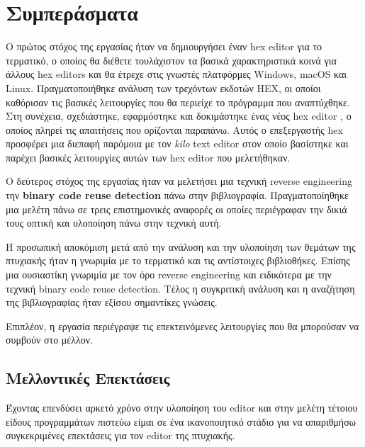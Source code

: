 \section{Συμπεράσματα}

Ο πρώτος στόχος της εργασίας ήταν να δημιουργήσει έναν hex editor για το τερματικό, ο οποίος θα διέθετε τουλάχιστον τα βασικά χαρακτηριστικά κοινά για άλλους hex editors και θα έτρεχε στις γνωστές πλατφόρμες Windows, macOS και Linux.
Πραγματοποιήθηκε ανάλυση των τρεχόντων εκδοτών HEX, οι οποίοι καθόρισαν τις βασικές λειτουργίες που θα περιείχε το πρόγραμμα που αναπτύχθηκε.
Στη συνέχεια, σχεδιάστηκε, εφαρμόστηκε και δοκιμάστηκε ένας νέος hex editor , ο οποίος πληρεί τις απαιτήσεις που ορίζονται παραπάνω.
Αυτός ο επεξεργαστής hex προσφέρει μια διεπαφή παρόμοια με τον \emph{kilo} text editor στον οποίο βασίστηκε και παρέχει βασικές λειτουργίες αυτών των hex editor που μελετήθηκαν.

Ο δεύτερος στόχος της εργασίας ήταν να μελετήσει μια τεχνική reverse engineering την \textbf{binary code reuse detection} πάνω στην βιβλιογραφία.
Πραγματοποίηθηκε μια μελέτη πάνω σε τρεις επιστημονικές αναφορές οι οποίες περιέγραφαν την δικιά τους οπτική και υλοποίηση πάνω στην τεχνική αυτή. 

H προσωπική αποκόμιση μετά από την ανάλυση και την υλοποίηση των θεμάτων της πτυχιακής ήταν η γνωριμία με το τερματικό και τις αντίστοιχες βιβλιοθήκες.
Επίσης μια ουσιαστίκη γνωριμία με τον όρο reverse engineering και ειδικότερα με την τεχνική binary code reuse detection.
Τέλος η συγκριτική ανάλυση και η αναζήτηση της βιβλιογραφίας ήταν εξίσου σημαντίκες γνώσεις.

Επιπλέον, η εργασία περιέγραψε τις επεκτεινόμενες λειτουργίες που θα μπορούσαν να συμβούν στο μέλλον.

\pagebreak
\subsection{Μελλοντικές Επεκτάσεις}
Έχοντας επενδύσει αρκετό χρόνο στην υλοποίηση του editor και στην μελέτη τέτοιου είδους προγραμμάτων πιστεύω είμαι σε ένα ικανοποιητικό στάδιο για να απαριθμήσω συγκεκριμένες επεκτάσεις για τον editor της πτυχιακής.

